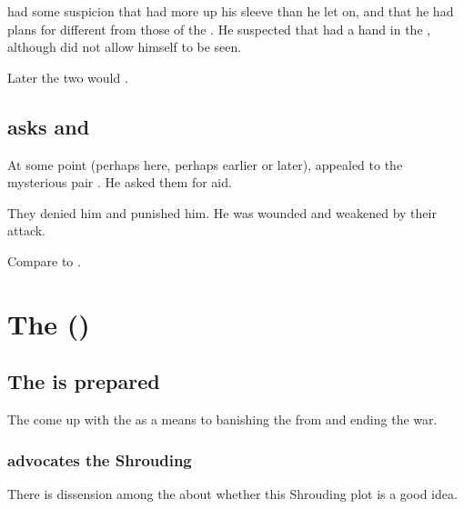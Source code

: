 \Ishnaruchaefir had some suspicion that \Azraid had more up his sleeve than he let on, and that he had plans for \Miith different from those of the \banelords.
He suspected that \Azraid had a hand in the \Shrouding, although \Azraid did not allow himself to be seen. 

Later the two would . 









\subsection{\Ishnaruchaefir asks \Zaz and \Urzaz}
At some point (perhaps here, perhaps earlier or later), \Ishnaruchaefir appealed to the mysterious pair . 
He asked them for aid. 

They denied him and punished him.
He was wounded and weakened by their attack.

Compare to .














\section{The \SecondShrouding ()}
\subsection{The \SecondShrouding{} is prepared}
The \dragons{} come up with the \SecondShrouding{} as a means to banishing the \banelords{} from \Miith{} and ending the war.





\subsubsection{\Ishnaruchaefir{} advocates the Shrouding}
There is dissension among the \dragons{} about whether this Shrouding plot is a good idea. 

